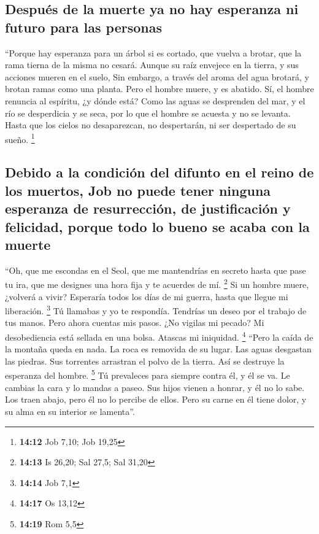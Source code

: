 \hypertarget{despuuxe9s-de-la-muerte-ya-no-hay-esperanza-ni-futuro-para-las-personas}{%
\subsection{Después de la muerte ya no hay esperanza ni futuro para las
personas}\label{despuuxe9s-de-la-muerte-ya-no-hay-esperanza-ni-futuro-para-las-personas}}

 ``Porque hay esperanza para un árbol si es cortado, que
vuelva a brotar, que la rama tierna de la misma no cesará.
 Aunque su raíz envejece en la tierra, y sus acciones
mueren en el suelo,  Sin embargo, a través del aroma del
agua brotará, y brotan ramas como una planta.  Pero el
hombre muere, y es abatido. Sí, el hombre renuncia al espíritu, ¿y dónde
está?  Como las aguas se desprenden del mar, y el río se
desperdicia y se seca,  por lo que el hombre se acuesta y
no se levanta. Hasta que los cielos no desaparezcan, no despertarán, ni
ser despertado de su sueño. \footnote{\textbf{14:12} Job 7,10; Job 19,25}

\hypertarget{debido-a-la-condiciuxf3n-del-difunto-en-el-reino-de-los-muertos-job-no-puede-tener-ninguna-esperanza-de-resurrecciuxf3n-de-justificaciuxf3n-y-felicidad-porque-todo-lo-bueno-se-acaba-con-la-muerte}{%
\subsection{Debido a la condición del difunto en el reino de los
muertos, Job no puede tener ninguna esperanza de resurrección, de
justificación y felicidad, porque todo lo bueno se acaba con la
muerte}\label{debido-a-la-condiciuxf3n-del-difunto-en-el-reino-de-los-muertos-job-no-puede-tener-ninguna-esperanza-de-resurrecciuxf3n-de-justificaciuxf3n-y-felicidad-porque-todo-lo-bueno-se-acaba-con-la-muerte}}

 ``Oh, que me escondas en el Seol, que me mantendrías en
secreto hasta que pase tu ira, que me designes una hora fija y te
acuerdes de mí. \footnote{\textbf{14:13} Is 26,20; Sal 27,5; Sal 31,20}
 Si un hombre muere, ¿volverá a vivir? Esperaría todos
los días de mi guerra, hasta que llegue mi liberación. \footnote{\textbf{14:14}
  Job 7,1}  Tú llamabas y yo te respondía. Tendrías un
deseo por el trabajo de tus manos.  Pero ahora cuentas
mis pasos. ¿No vigilas mi pecado?  Mi desobediencia está
sellada en una bolsa. Atascas mi iniquidad. \footnote{\textbf{14:17} Os
  13,12}  ``Pero la caída de la montaña queda en nada. La
roca es removida de su lugar.  Las aguas desgastan las
piedras. Sus torrentes arrastran el polvo de la tierra. Así se destruye
la esperanza del hombre. \footnote{\textbf{14:19} Rom 5,5}
 Tú prevaleces para siempre contra él, y él se va. Le
cambias la cara y lo mandas a paseo.  Sus hijos vienen a
honrar, y él no lo sabe. Los traen abajo, pero él no lo percibe de
ellos.  Pero su carne en él tiene dolor, y su alma en su
interior se lamenta''.

